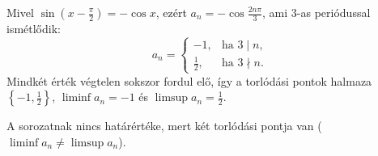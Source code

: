 \documentclass[11pt]{scrartcl}
\begin{document}
Mivel $\sin\left(x - \frac{\pi}{2}\right) = -\cos x$, ezért
\(
a_n = -\cos \frac{2n\pi}{3}
\),
ami $3$-as periódussal ismétlődik:
\[
	a_n = \begin{cases}
		-1,            & \text{ha } 3 \mid n,    \\
		\frac{1}{2}, & \text{ha } 3 \nmid n.
	\end{cases}
\]
Mindkét érték végtelen sokszor fordul elő, így a torlódási pontok halmaza
$\left\{ -1, \frac{1}{2} \right\}$, $\liminf a_n = -1$ és
$\limsup a_n = \frac{1}{2}$.

A sorozatnak nincs határértéke, mert két torlódási pontja van
($\liminf a_n \ne \limsup a_n$).
\end{document}
